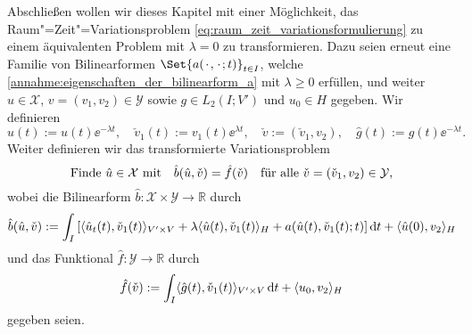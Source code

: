 \documentclass[../main.tex]{subfiles}
\begin{document}
Abschließen wollen wir dieses Kapitel mit einer Möglichkeit, das Raum"=Zeit"=Variationsproblem \cref{eq:raum_zeit_variationsformulierung} zu einem äquivalenten Problem mit $\lambda = 0$ zu transformieren.
Dazu seien erneut eine Familie von Bilinearformen $\Set{a(\blank, \blank; t)}_{t \in I}$, welche \cref{annahme:eigenschaften_der_bilinearform_a} mit $\lambda \geq 0$ erfüllen, und weiter $u \in \mathcal X$, $v = (v_{1}, v_{2}) \in \mathcal Y$ sowie $g \in L_{2}(I; V')$ und $u_{0} \in H$ gegeben.
Wir definieren
\begin{equation}
    \hat{u}(t) := u(t)\ee^{- \lambda t}, \quad \check{v}_{1}(t) := v_{1}(t)\ee^{\lambda t}, \quad \check{v} := (\check{v}_{1}, v_{2}), \quad \hat{g}(t) := g(t)\ee^{-\lambda t}.
\end{equation}
Weiter definieren wir das transformierte Variationsproblem
\begin{equation}
\label{eq:transformiertes_raum_zeit_variationsproblem}
    \text{Finde } \hat{u} \in \mathcal X \text{ mit} \quad \hat{b}(\hat{u}, \check{v}) = \hat{f}(\check{v}) \quad \fa \check{v} = (\check{v}_{1}, v_{2}) \in \mathcal Y,
\end{equation}
wobei die Bilinearform $\hat{b} \colon \mathcal X \times \mathcal Y \to \mathbb{R}$ durch
\begin{equation}
    \hat{b}(\hat{u}, \check{v}) := \int_{I} \left[ \langle\hat{u}_{t}(t),\check{v}_{1}(t)\rangle_{V' \times V} + \lambda \langle\hat{u}(t),\check{v}_{1}(t)\rangle_{H} + a(\hat{u}(t), \check{v}_{1}(t); t) \right] \mathop{}\!\mathrm{d} t + \langle\hat{u}(0),v_{2}\rangle_{H}
\end{equation}
und das Funktional $\hat{f} \colon \mathcal Y \to \mathbb{R}$ durch
\begin{equation}
    \hat{f}(\check{v}) := \int_{I} \langle\hat{g}(t),\check{v}_{1}(t)\rangle_{V' \times V} \mathop{}\!\mathrm{d} t + \langle u_{0},v_{2}\rangle_{H}
\end{equation}
gegeben seien.
\end{document}
